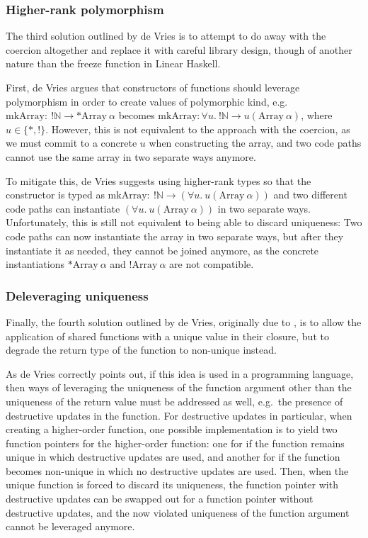 \subsubsection{Higher-rank polymorphism}
The third solution outlined by de Vries is to attempt to do away with the coercion altogether and replace it with careful library design, though of another nature than the freeze function in Linear Haskell. 

First, de Vries argues that constructors of functions should leverage polymorphism in order to create values of polymorphic kind, e.g.\ $\mathrm{mkArray} :\ !\mathbb{N} \to *\mathrm{Array}\ \alpha$ becomes $\mathrm{mkArray} : \forall u.\ !\mathbb{N} \to u(\mathrm{Array}\ \alpha)$, where $u \in \{*, !\}$. However, this is not equivalent to the approach with the coercion, as we must commit to a concrete $u$ when constructing the array, and two code paths cannot use the same array in two separate ways anymore. 

To mitigate this, de Vries suggests using higher-rank types so that the constructor is typed as $\mathrm{mkArray} : \ !\mathbb{N} \to (\forall u.\ u(\mathrm{Array}\ \alpha))$ and two different code paths can instantiate $(\forall u.\ u(\mathrm{Array}\ \alpha))$ in two separate ways. Unfortunately, this is still not equivalent to being able to discard uniqueness: Two code paths can now instantiate the array in two separate ways, but after they instantiate it as needed, they cannot be joined anymore, as the concrete instantiations $*\mathrm{Array}\ \alpha$ and $!\mathrm{Array}\ \alpha$ are not compatible.

\subsubsection{Deleveraging uniqueness}
Finally, the fourth solution outlined by de Vries, originally due to \cite{harrington_uniqueness_2006}, is to allow the application of shared functions with a unique value in their closure, but to degrade the return type of the function to non-unique instead. 

As de Vries correctly points out, if this idea is used in a programming language, then ways of leveraging the uniqueness of the function argument other than the uniqueness of the return value must be addressed as well, e.g.\ the presence of destructive updates in the function. For destructive updates in particular, when creating a higher-order function, one possible implementation is to yield two function pointers for the higher-order function: one for if the function remains unique in which destructive updates are used, and another for if the function becomes non-unique in which no destructive updates are used. Then, when the unique function is forced to discard its uniqueness, the function pointer with destructive updates can be swapped out for a function pointer without destructive updates, and the now violated uniqueness of the function argument cannot be leveraged anymore.

